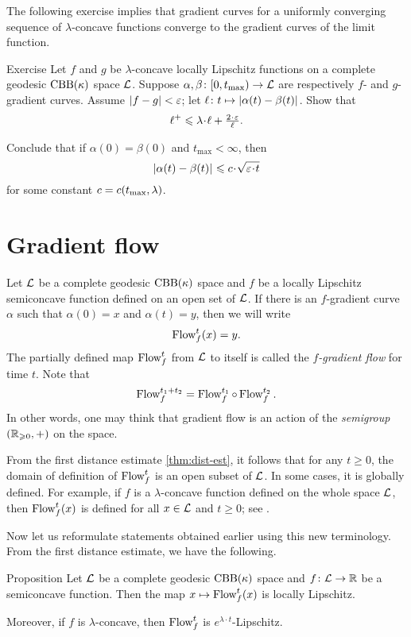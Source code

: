 The following exercise implies that gradient curves for a uniformly converging sequence of $\lambda$-concave functions converge to the gradient curves of the limit function.

\begin{thm}{Exercise}\label{lem:fg-dist-est}
Let $f$ and $g$ be $\lambda$-concave locally Lipschitz functions on a complete geodesic $\mathrm{CBB}(\kappa)$ space $\mathcal{L}$.
Suppose
$\alpha,\beta\colon[0,t_{\max})\to \mathcal{L}$ are respectively $f$- and $g$-gradient curves.
Assume $|f-g|<\varepsilon$; let $\ell\:t\mapsto\dist{\alpha(t)}{\beta(t)}{}$.
Show that
\[\ell^+\le \lambda\cdot\ell+\tfrac{2\cdot\eps}{\ell}.\]

Conclude that if $\alpha(0)=\beta(0)$ and $t_{\max}<\infty$, then
\[\dist{\alpha(t)}{\beta(t)}{}
\le
\Const\cdot\sqrt{\eps\cdot t}\]
for some constant $c=c(t_{\max},\lambda)$.
\end{thm}

\section{Gradient flow}

Let $\mathcal{L}$ be a complete geodesic $\mathrm{CBB}(\kappa)$ space 
and $f$ be a locally Lipschitz semiconcave function defined on an open set of $\mathcal{L}$.
If there is an $f$-gradient curve $\alpha$ such that $\alpha(0)=x$ and $\alpha(t)=y$,
then we will write 
\[\mathop{\rm Flow}\nolimits^t_f(x)=y.\]
The partially defined map $\mathop{\rm Flow}\nolimits^t_f$ from $\mathcal{L}$ to itself is called the \emph{$f$-gradient flow} for time $t$.
Note that
\[\mathop{\rm Flow}\nolimits^{t_1+t_2}_f=\mathop{\rm Flow}\nolimits_f^{t_1}\circ\mathop{\rm Flow}\nolimits_f^{t_2}.\]
In other words, one may think that gradient flow is an action of the \textit{semigroup} $(\mathbb{R}_{\geqslant0},+)$ on the space.
 
From the first distance estimate \ref{thm:dist-est}, 
it follows that for any $t\ge 0$, the domain of definition of $\mathop{\rm Flow}\nolimits^t_f$ is an open subset of $\mathcal{L}$.
In some cases, it is globally defined.
For example, if $f$ is a $\lambda$-concave function defined on the whole space $\mathcal{L}$, then $\mathop{\rm Flow}\nolimits^t_f(x)$ is defined for all $x\in \mathcal{L}$ and $t\ge0$;
see \cite[16.19]{alexander-kapovitch-petrunin2024}.

Now let us reformulate statements obtained earlier using this new terminology.
From the first distance estimate, we have the following.

\begin{thm}{Proposition}\label{prop:GF-is-lip}
Let $\mathcal{L}$ be a complete geodesic $\mathrm{CBB}(\kappa)$ space 
and $f\colon\mathcal{L}\to \mathbb{R}$ be a semiconcave function.
Then the map $x\mapsto\mathop{\rm Flow}\nolimits^t_f(x)$ is locally Lipschitz.

Moreover, if $f$ is $\lambda$-concave, then $\mathop{\rm Flow}\nolimits^t_f$ is $e^{\lambda\cdot t}$-Lipschitz.
\end{thm}

